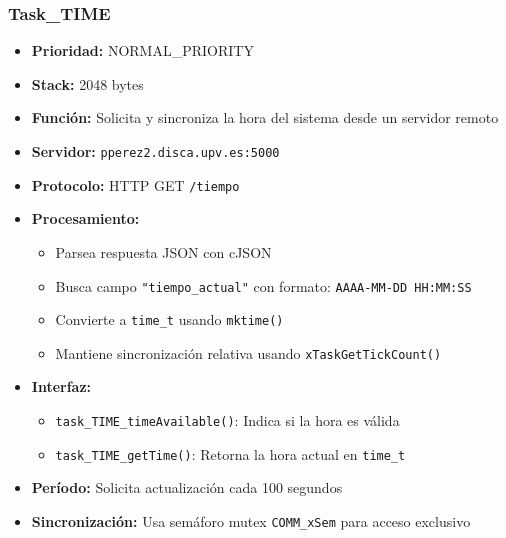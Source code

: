 \documentclass[12pt,a4paper]{article}
\begin{document}
\subsubsection{Task\_TIME}
\begin{itemize}
    \item \textbf{Prioridad:} NORMAL\_PRIORITY
    \item \textbf{Stack:} 2048 bytes
    \item \textbf{Función:} Solicita y sincroniza la hora del sistema desde un servidor remoto
    \item \textbf{Servidor:} \texttt{pperez2.disca.upv.es:5000}
    \item \textbf{Protocolo:} HTTP GET \texttt{/tiempo}
    \item \textbf{Procesamiento:}
    \begin{itemize}
        \item Parsea respuesta JSON con cJSON
        \item Busca campo \texttt{"tiempo\_actual"} con formato: \texttt{AAAA-MM-DD HH:MM:SS}
        \item Convierte a \texttt{time\_t} usando \texttt{mktime()}
        \item Mantiene sincronización relativa usando \texttt{xTaskGetTickCount()}
    \end{itemize}
    \item \textbf{Interfaz:}
    \begin{itemize}
        \item \texttt{task\_TIME\_timeAvailable()}: Indica si la hora es válida
        \item \texttt{task\_TIME\_getTime()}: Retorna la hora actual en \texttt{time\_t}
    \end{itemize}
    \item \textbf{Período:} Solicita actualización cada 100 segundos
    \item \textbf{Sincronización:} Usa semáforo mutex \texttt{COMM\_xSem} para acceso exclusivo
\end{itemize}
\end{document}
